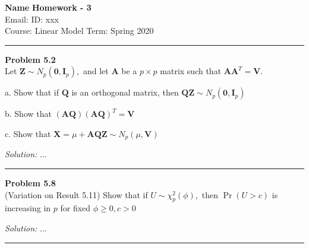 \documentclass[a4paper, 11pt]{article}
\newenvironment{problem}[2][Problem]
    { \begin{mdframed}[backgroundcolor=gray!20] \textbf{#1 #2} \\}
    {  \end{mdframed}}
\newenvironment{solution}
    {\textit{Solution:}}
    {}
\begin{document}
\noindent

\large\textbf{Name} \hfill \textbf{Homework - 3}   \\
Email:  \hfill ID: xxx\\
\normalsize Course: Linear Model   \hfill Term: Spring 2020\\
\noindent\rule{7in}{2.8pt}

\begin{problem}{5.2}
Let $\mathbf{Z} \sim N_{p}\left(\mathbf{0}, \mathbf{I}_{p}\right),$ and let $\mathbf{A}$ be a $p \times p$ matrix such that $\mathbf{A A}^{T}=\mathbf{V}$.

a. Show that if $\mathbf{Q}$ is an orthogonal matrix, then $\mathbf{Q Z} \sim N_{p}\left(\mathbf{0}, \mathbf{I}_{p}\right)$

b. Show that $(\mathbf{A Q})(\mathbf{A Q})^{T}=\mathbf{V}$

c. Show that $\mathbf{X}=\mu+\mathbf{A Q Z} \sim N_{p}(\mu, \mathbf{V})$
\end{problem}
\begin{solution}
...
\end{solution}

\noindent\rule{7in}{2.8pt}


\begin{problem}{5.8}
(Variation on Result 5.11) Show that if $U \sim \chi_{p}^{2}(\phi),$ then $\operatorname{Pr}(U>c)$ is increasing in $p$ for fixed $\phi \geq 0, c>0$
\end{problem}
\begin{solution}
...
\end{solution}

\noindent\rule{7in}{2.8pt}
\end{document}
